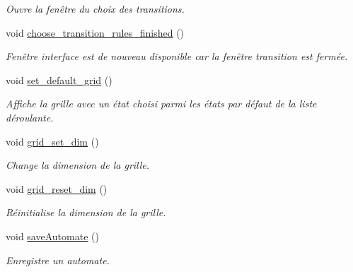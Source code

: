 \begin{DoxyCompactItemize}
\begin{DoxyCompactList}\small\item\em Ouvre la fenêtre du choix des transitions. \end{DoxyCompactList}\item 
\mbox{\label{class_simulator_interface_a433b7220ab937f4596871fa4c470c962}} 
void \mbox{\hyperlink{class_simulator_interface_a433b7220ab937f4596871fa4c470c962}{choose\+\_\+transition\+\_\+rules\+\_\+finished}} ()
\begin{DoxyCompactList}\small\item\em Fenêtre interface est de nouveau disponible car la fenêtre transition est fermée. \end{DoxyCompactList}\item 
\mbox{\label{class_simulator_interface_a4dfa1d99f6dbe46ad3ec5faa0f2d11b4}} 
void \mbox{\hyperlink{class_simulator_interface_a4dfa1d99f6dbe46ad3ec5faa0f2d11b4}{set\+\_\+default\+\_\+grid}} ()
\begin{DoxyCompactList}\small\item\em Affiche la grille avec un état choisi parmi les états par défaut de la liste déroulante. \end{DoxyCompactList}\item 
void \mbox{\hyperlink{class_simulator_interface_a86a19994b8db3df11adabda5ed31fd82}{grid\+\_\+set\+\_\+dim}} ()
\begin{DoxyCompactList}\small\item\em Change la dimension de la grille. \end{DoxyCompactList}\item 
void \mbox{\hyperlink{class_simulator_interface_a08a37bff3f4287241055bd36cf6aafde}{grid\+\_\+reset\+\_\+dim}} ()
\begin{DoxyCompactList}\small\item\em Réinitialise la dimension de la grille. \end{DoxyCompactList}\item 
void \mbox{\hyperlink{class_simulator_interface_a723933742f1dfb0f0e87754c99230eb4}{save\+Automate}} ()
\begin{DoxyCompactList}\small\item\em Enregistre un automate. \end{DoxyCompactList}\end{DoxyCompactItemize}
